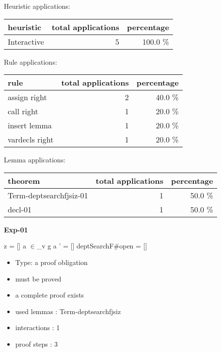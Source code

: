 \documentclass[a4paper]{article}
\begin{document}
\medskip


Heuristic applications:

\begin{supertabular}{l|r|r}
heuristic	& total applications & percentage \\ \hline
Interactive & 5 & 100.0 \% \\

\end{supertabular}

Rule applications:

\begin{supertabular}{l|r|r}
rule	        & total applications & percentage \\ \hline
assign right & 2 & 40.0 \% \\
call right & 1 & 20.0 \% \\
insert lemma & 1 & 20.0 \% \\
vardecls right & 1 & 20.0 \% \\

\end{supertabular}

Lemma applications:

\begin{supertabular}{l|r|r}
theorem	        & total applications & percentage \\ \hline
Term-deptsearchfjsiz-01 & 1 & 50.0 \% \\
decl-01 & 1 & 50.0 \% \\

\end{supertabular}
\pagebreak

{\LARGE\bf Exp-01}\label{lemma-Exp-01}

\medskip

 \Fol z = [] \And a $\in$\_v g \Or a ' = [] \Imp \Do deptSearchF\#\Dc open = []

\begin{itemize}

\item Type: a proof obligation

\item       must be proved
\item       a complete proof exists
\item       used lemmas  : Term-deptsearchfjsiz
\item       interactions : 1
\item       proof steps  : 3
\end{itemize}

\medskip
\end{document}
